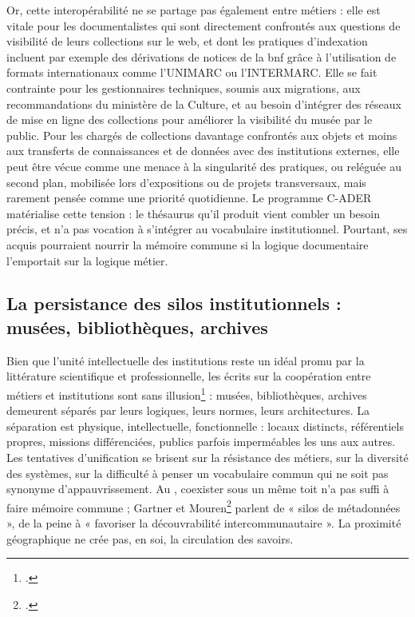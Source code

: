 Or, cette interopérabilité ne se partage pas également entre métiers : elle est vitale pour les documentalistes qui sont directement confrontés aux questions de visibilité de leurs collections sur le web, et dont les pratiques d'indexation incluent par exemple des dérivations de notices de la \ac{bnf} grâce à l'utilisation de formats internationaux comme l'UNIMARC ou l'INTERMARC. Elle se fait contrainte pour les gestionnaires techniques, soumis aux migrations, aux recommandations du ministère de la Culture, et au besoin d’intégrer des réseaux de mise en ligne des collections pour améliorer la visibilité du musée par le public. Pour les chargés de collections davantage confrontés aux objets et moins aux transferts de connaissances et de données avec des institutions externes, elle peut être vécue comme une menace à la singularité des pratiques, ou reléguée au second plan, mobilisée lors d’expositions ou de projets transversaux, mais rarement pensée comme une priorité quotidienne. Le programme C-ADER matérialise cette tension : le thésaurus qu’il produit vient combler un besoin précis, et n’a pas vocation à s’intégrer au vocabulaire institutionnel. Pourtant, ses acquis pourraient nourrir la mémoire commune si la logique documentaire l’emportait sur la logique métier.

\subsection{La persistance des silos institutionnels : musées, bibliothèques, archives}

Bien que l'unité intellectuelle des institutions reste un idéal promu par la littérature scientifique et professionnelle, les écrits sur la coopération entre métiers et institutions sont sans illusion\footcite{gartnerArchivesMuseumsLibraries2019,rossini-paquetBibliothequesMuseesQuellesa,yarrowBibliothequesPubliquesArchives2008a} : musées, bibliothèques, archives demeurent séparés par leurs logiques, leurs normes, leurs architectures. La séparation est physique, intellectuelle, fonctionnelle : locaux distincts, référentiels propres, missions différenciées, publics parfois imperméables les uns aux autres. Les tentatives d’unification se brisent sur la résistance des métiers, sur la diversité des systèmes, sur la difficulté à penser un vocabulaire commun qui ne soit pas synonyme d’appauvrissement. Au \mae, coexister sous un même toit n’a pas suffi à faire mémoire commune ; Gartner et Mouren\footcite{gartnerArchivesMuseumsLibraries2019} parlent de « silos de métadonnées », de la peine à « favoriser la découvrabilité intercommunautaire ». La proximité géographique ne crée pas, en soi, la circulation des savoirs.

